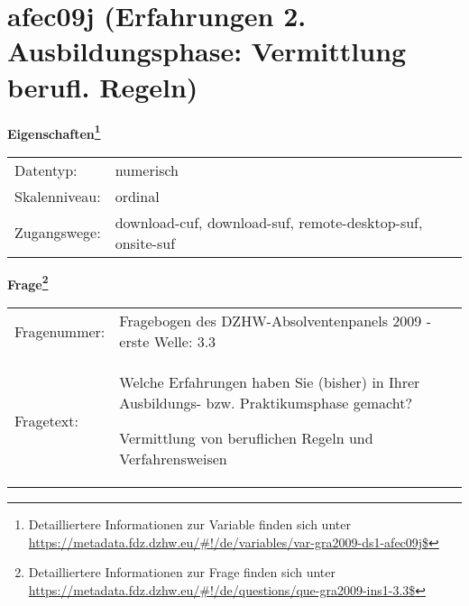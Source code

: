 
    \setcounter{footnote}{0}

    \vspace*{-1.8cm}
	\section{afec09j (Erfahrungen 2. Ausbildungsphase: Vermittlung berufl. Regeln)}
	\label{section:afec09j}



    \vspace*{0.5cm}
    \noindent\textbf{Eigenschaften\footnote{Detailliertere Informationen zur Variable finden sich unter
		\url{https://metadata.fdz.dzhw.eu/\#!/de/variables/var-gra2009-ds1-afec09j$}}}\\
	\begin{tabularx}{\hsize}{@{}lX}
	Datentyp: & numerisch \\
	Skalenniveau: & ordinal \\
	Zugangswege: &
	  download-cuf, 
	  download-suf, 
	  remote-desktop-suf, 
	  onsite-suf
 \\
    \end{tabularx}



				\vspace*{0.5cm}
                \noindent\textbf{Frage\footnote{Detailliertere Informationen zur Frage finden sich unter
		              \url{https://metadata.fdz.dzhw.eu/\#!/de/questions/que-gra2009-ins1-3.3$}}}\\
				\begin{tabularx}{\hsize}{@{}lX}
					Fragenummer: &
					  Fragebogen des DZHW-Absolventenpanels 2009 - erste Welle:
					  3.3
 \\
					Fragetext: & Welche Erfahrungen haben Sie (bisher) in Ihrer Ausbildungs- bzw. Praktikumsphase gemacht?\par  Vermittlung von beruflichen Regeln und Verfahrensweisen \\
				\end{tabularx}





